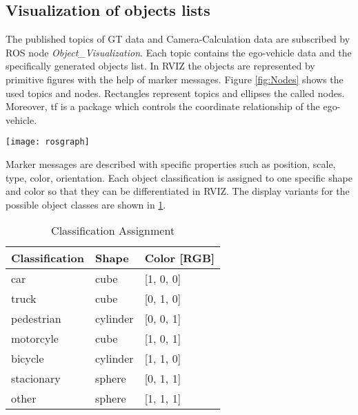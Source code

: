 \subsection{Visualization of objects lists}

The published topics of \ac{GT} data and Camera-Calculation data are subscribed by \ac{ROS} node \textit{Object\_Visualization}. Each topic contains the ego-vehicle data and the specifically generated objects list. In \ac{RVIZ} the objects are represented by primitive figures with the help of marker messages. Figure \ref{fig:Nodes} shows the used topics and nodes. Rectangles represent topics and ellipses the called nodes. Moreover, tf is a package which controls the coordinate relationship of the ego-vehicle.
\begin{figure*}[thpb]
	\centering
	\texttt{[image: rosgraph]}
	\caption{Nodes (ellipses)/ Topics (rectangles) in \ac{ROS}}
	\label{fig:Nodes}
\end{figure*}
Marker messages are described with specific properties such as position, scale, type, color, orientation. Each object classification is assigned to one specific shape and color so that they can be differentiated in \ac{RVIZ}. The display variants for the possible object classes are shown in \cref{ClassificationAssignment}. 
\begin{table}[h]
	\caption{Classification Assignment}
	\begin{tabularx}{\columnwidth}{XXX}
		\toprule
		Classification & Shape & Color [RGB]\\
		\toprule
		car & cube & [1, 0, 0]\\
		truck & cube & [0, 1, 0]\\
		pedestrian & cylinder & [0, 0, 1]\\
		motorcyle & cube & [1, 0, 1]\\
		bicycle & cylinder & [1, 1, 0]\\
		stacionary & sphere & [0, 1, 1]\\
		other & sphere & [1, 1, 1]\\
		\bottomrule
	\end{tabularx}
	\label{ClassificationAssignment}
\end{table}

